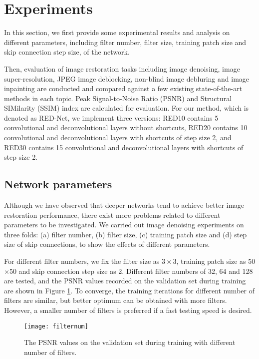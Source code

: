 \section{Experiments}
\label{sec:exp}


In this section, we first provide some experimental results and analysis
on different parameters, including filter number, filter size, training patch
size and skip connection step size, of the network.

Then, evaluation of image
restoration tasks including image denoising, image super-resolution, JPEG image
deblocking, non-blind image debluring and image inpainting are conducted and
compared against a few existing state-of-the-art methods in each topic.
Peak Signal-to-Noise Ratio (PSNR) and Structural SIMilarity (SSIM) index are
calculated for evaluation. For our method, which is denoted as RED-Net,
we implement three versions: RED10 contains 5 convolutional and deconvolutional
layers without shortcuts, RED20 contains 10 convolutional and deconvolutional
layers with shortcuts of step size 2, and RED30 contains 15 convolutional
and deconvolutional layers with shortcuts of step size 2.




\subsection{Network parameters}

Although we have observed that deeper networks tend to achieve better image restoration
performance, there exist more problems related to different parameters to be investigated.
We carried out image denoising experiments on three folds: (a) filter number,
(b) filter size, (c) training patch size and (d) step size of skip connections, to
show the effects of different parameters.

For different filter numbers, we fix the filter size as $3\times3$, training patch size
as 50$\times$50 and skip connection step size as 2. Different filter numbers of 32, 64
and 128 are tested, and the PSNR values recorded on the validation set during training
are shown in Figure \ref{fig9}. To converge, the training iterations for different number
of filters are similar, but better optimum can be obtained with more filters. However,
a smaller number of filters is preferred if a fast testing speed is desired.

\begin{figure}[t!]
\centering
\texttt{[image: filternum]}
\caption{The PSNR values on the validation set during training with different number of filters.}
\label{fig9}
\end{figure}

